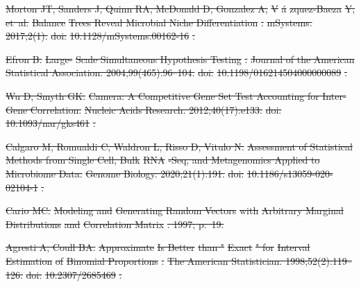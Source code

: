 \documentclass[10pt,letterpaper]{article}
\providecommand{\DIFdeltex}[1]{{\protect\color{red}\sout{#1}}}                      %
\providecommand{\DIFdel}[1]{\texorpdfstring{\DIFdeltex{#1}}{}} %
\begin{document}
\DIFdel{Morton JT, Sanders J, Quinn RA, McDonald D, Gonzalez A, }%
\DIFdel{V}%
\DIFdel{\'a}%
\DIFdel{zquez-Baeza}%
\DIFdel{Y,
  et~al.
}%
\DIFdel{Balance }%
\DIFdel{Trees Reveal Microbial Niche Differentiation}%
\DIFdel{.
}%
\DIFdel{mSystems. 2017;2(1).
}%
\DIFdel{doi:}%
\DIFdel{10.1128/mSystems.00162-16}%
\DIFdel{.
}%

\DIFdel{Efron B.
}%
\DIFdel{Large-}%
\DIFdel{Scale Simultaneous Hypothesis Testing}%
\DIFdel{.
}%
\DIFdel{Journal of the American Statistical Association.
  2004;99(465):96--104.
}%
\DIFdel{doi:}%
\DIFdel{10.1198/016214504000000089}%
\DIFdel{.
}%

\DIFdel{Wu D, Smyth GK.
}%
\DIFdel{Camera: A Competitive Gene Set Test Accounting for Inter-Gene
  Correlation.
}%
\DIFdel{Nucleic Acids Research. 2012;40(17):e133.
}%
\DIFdel{doi:}%
\DIFdel{10.1093/nar/gks461}%
\DIFdel{.
}%

\DIFdel{Calgaro M, Romualdi C, Waldron L, Risso D, Vitulo N.
}%
\DIFdel{Assessment of Statistical Methods from Single Cell, Bulk }%
\DIFdel{RNA}%
\DIFdel{-Seq,
  and Metagenomics Applied to Microbiome Data.
}%
\DIFdel{Genome Biology. 2020;21(1):191.
}%
\DIFdel{doi:}%
\DIFdel{10.1186/s13059-020-02104-1}%
\DIFdel{.
}%

\DIFdel{Cario MC.
}%
\DIFdel{Modeling and }%
\DIFdel{Generating Random Vectors}%
\DIFdel{with }%
\DIFdel{Arbitrary Marginal
  Distributions}%
\DIFdel{and }%
\DIFdel{Correlation Matrix}%
\DIFdel{. 1997; p.~19.
}%

\DIFdel{Agresti A, Coull BA.
}%
\DIFdel{Approximate }%
\DIFdel{Is Better}%
\DIFdel{than "}%
\DIFdel{Exact}%
\DIFdel{" for }%
\DIFdel{Interval
  Estimation}%
\DIFdel{of }%
\DIFdel{Binomial Proportions}%
\DIFdel{.
}%
\DIFdel{The American Statistician. 1998;52(2):119--126.
}%
\DIFdel{doi:}%
\DIFdel{10.2307/2685469}%
\DIFdel{.
}%
\end{document}
